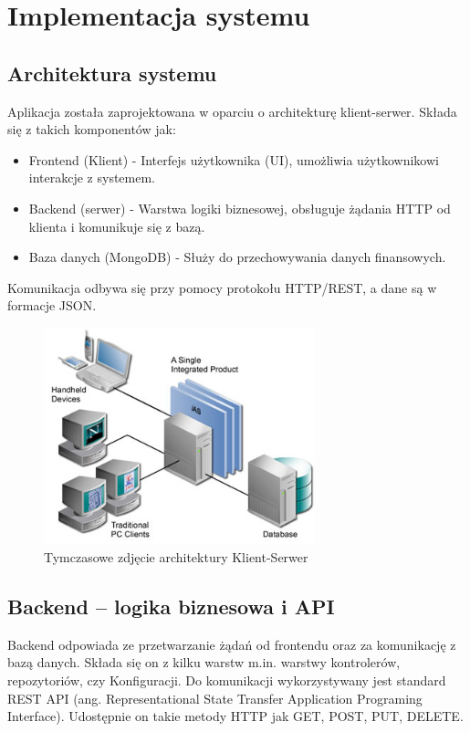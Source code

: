 \chapter{Implementacja systemu}
\section{Architektura systemu}
Aplikacja została zaprojektowana w oparciu o architekturę klient-serwer. Składa się z takich komponentów jak:
\begin{itemize}
	\item Frontend (Klient) - Interfejs użytkownika (UI), umożliwia użytkownikowi interakcje z systemem.
	\item Backend (serwer) - Warstwa logiki biznesowej, obsługuje żądania HTTP od klienta i komunikuje się z bazą.
	\item Baza danych (MongoDB) - Służy do przechowywania danych finansowych.
\end{itemize}

Komunikacja odbywa się przy pomocy protokołu HTTP/REST, a dane są w formacje JSON.
\begin{figure}[H]
	\centering
	\includegraphics[width=0.7\textwidth]{images/vis.jpg}
	\caption{Tymczasowe zdjęcie architektury Klient-Serwer}
	\label{fig:KlientSerwer}
\end{figure}
\section{Backend – logika biznesowa i API}
Backend odpowiada ze przetwarzanie żądań od frontendu oraz za komunikację z bazą danych. Składa się on z kilku warstw m.in. warstwy kontrolerów, repozytoriów, czy Konfiguracji. Do komunikacji wykorzystywany jest standard REST API (ang. Representational State Transfer Application Programing Interface). Udostępnie on takie metody HTTP jak GET, POST, PUT, DELETE.
